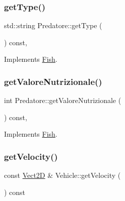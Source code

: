 \mbox{\label{classPredatore_ae88add4104d54d5973b87d76f796a97c_ae88add4104d54d5973b87d76f796a97c}} 
\subsubsection{\texorpdfstring{get\+Type()}{getType()}}
{\footnotesize\ttfamily std\+::string Predatore\+::get\+Type (\begin{DoxyParamCaption}{ }\end{DoxyParamCaption}) const\hspace{0.3cm}{\ttfamily [override]}, {\ttfamily [virtual]}}



Implements \hyperlink{classFish_adb00fb6bac2fad27660107c12d1a7fa2_adb00fb6bac2fad27660107c12d1a7fa2}{Fish}.

\mbox{\label{classPredatore_a9317be30d28ab61d3f7472f2b1183ba3_a9317be30d28ab61d3f7472f2b1183ba3}} 
\subsubsection{\texorpdfstring{get\+Valore\+Nutrizionale()}{getValoreNutrizionale()}}
{\footnotesize\ttfamily int Predatore\+::get\+Valore\+Nutrizionale (\begin{DoxyParamCaption}{ }\end{DoxyParamCaption}) const\hspace{0.3cm}{\ttfamily [override]}, {\ttfamily [virtual]}}



Implements \hyperlink{classFish_a97dd71f31af1e36a630944c5c5b8ff33_a97dd71f31af1e36a630944c5c5b8ff33}{Fish}.

\mbox{\label{classVehicle_a87b8266cb3495e8444233a0724e1bf07_a87b8266cb3495e8444233a0724e1bf07}} 
\subsubsection{\texorpdfstring{get\+Velocity()}{getVelocity()}}
{\footnotesize\ttfamily const \hyperlink{classVect2D}{Vect2D} \& Vehicle\+::get\+Velocity (\begin{DoxyParamCaption}{ }\end{DoxyParamCaption}) const\hspace{0.3cm}{\ttfamily [inherited]}}


